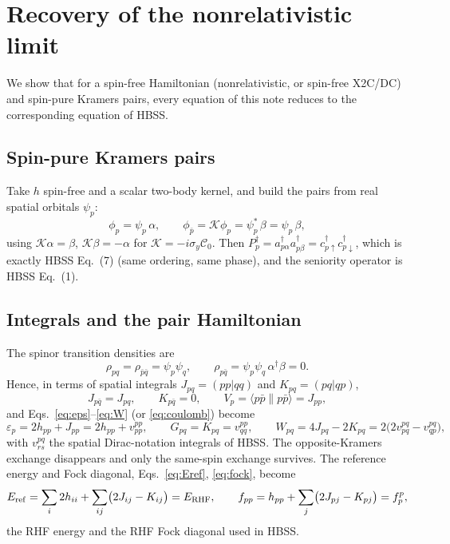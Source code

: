 \documentclass[11pt,a4paper]{article}
\newcommand{\kb}[1]{\bar{#1}}                 %
\newcommand{\Pd}[1]{P^{\dagger}_{#1}}
\newcommand{\asym}[4]{\langle #1 #2 \| #3 #4 \rangle}
\begin{document}
\section{Recovery of the nonrelativistic limit}
\label{sec:nrlimit}

We show that for a spin-free Hamiltonian (nonrelativistic, or spin-free X2C/DC) and spin-pure
Kramers pairs, every equation of this note reduces to the corresponding equation of HBSS.

\subsection{Spin-pure Kramers pairs}

Take $h$ spin-free and a scalar two-body kernel, and build the pairs from real spatial orbitals $\psi_p$:
\begin{equation}
  \phi_p=\psi_p\,\alpha,\qquad \phi_{\kb p}=\mathcal K\phi_p=\psi_p^{*}\,\beta=\psi_p\,\beta ,
\end{equation}
using $\mathcal K\alpha=\beta$, $\mathcal K\beta=-\alpha$ for $\mathcal K=-i\sigma_y\mathcal C_0$.
Then $\Pd p=a^\dagger_{p\alpha}a^\dagger_{p\beta}=c^\dagger_{p\uparrow}c^\dagger_{p\downarrow}$, which is
exactly HBSS Eq.~(7) (same ordering, same phase), and the seniority operator is HBSS Eq.~(1).

\subsection{Integrals and the pair Hamiltonian}

The spinor transition densities are
\begin{equation}
  \rho_{pq}=\rho_{\kb p\kb q}=\psi_p\psi_q,\qquad \rho_{p\kb q}=\psi_p\psi_q\,\alpha^\dagger\beta=0 .
\end{equation}
Hence, in terms of spatial integrals $J_{pq}=(pp|qq)$ and $K_{pq}=(pq|qp)$,
\begin{equation}
  J_{p\kb q}=J_{pq},\qquad K_{p\kb q}=0,\qquad V_p=\asym p{\kb p}p{\kb p}=J_{pp},
\end{equation}
and Eqs.~\eqref{eq:eps}--\eqref{eq:W} (or \eqref{eq:coulomb}) become
\begin{equation}
  \varepsilon_p=2h_{pp}+J_{pp}=2h_{pp}+v^{pp}_{pp},\qquad
  G_{pq}=K_{pq}=v^{pp}_{qq},\qquad
  W_{pq}=4J_{pq}-2K_{pq}=2\bigl(2v^{pq}_{pq}-v^{pq}_{qp}\bigr),
  \label{eq:nrparams}
\end{equation}
with $v^{pq}_{rs}$ the spatial Dirac-notation integrals of HBSS. The opposite-Kramers exchange
disappears and only the same-spin exchange survives. The reference energy and Fock diagonal,
Eqs.~\eqref{eq:Eref}, \eqref{eq:fock}, become
\begin{equation}
  E_{\rm ref}=\sum_i 2h_{ii}+\sum_{ij}\bigl(2J_{ij}-K_{ij}\bigr)=E_{\rm RHF},\qquad
  f_{pp}=h_{pp}+\sum_j\bigl(2J_{pj}-K_{pj}\bigr)=f^p_p ,
\end{equation}
the RHF energy and the RHF Fock diagonal used in HBSS.
\end{document}
